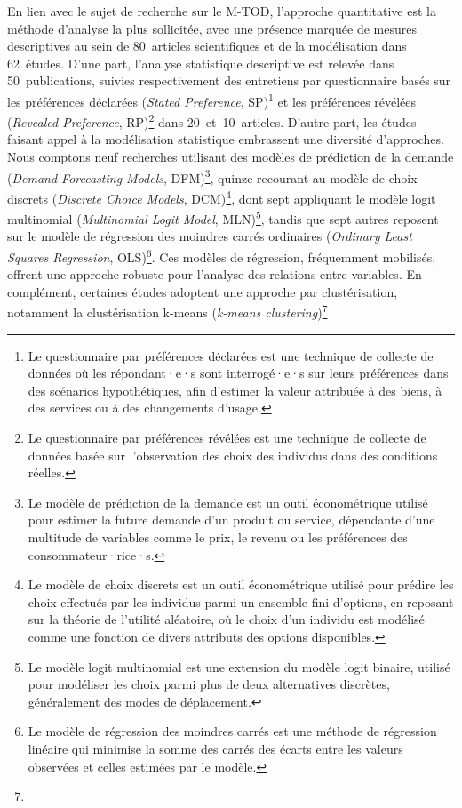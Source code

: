 \begin{refsegment}
En lien avec le sujet de recherche sur le \acrshort{M-TOD}, l'approche quantitative est la méthode d'analyse la plus sollicitée, avec une présence marquée de mesures descriptives au sein de 80~articles scientifiques et de la modélisation dans 62~études. D'une part, l'analyse statistique descriptive est relevée dans 50~publications, suivies respectivement des entretiens par questionnaire basés sur les préférences déclarées (\textsl{Stated Preference}, SP)\footnote{
    Le questionnaire par préférences déclarées est une technique de collecte de données où les répondant·e·s sont interrogé·e·s sur leurs préférences dans des scénarios hypothétiques, afin d'estimer la valeur attribuée à des biens, à des services ou à des changements d'usage.
} et les préférences révélées (\textsl{Revealed Preference}, RP)\footnote{
    Le questionnaire par préférences révélées est une technique de collecte de données basée sur l'observation des choix des individus dans des conditions réelles.
} dans 20~et~10~articles. D'autre part, les études faisant appel à la modélisation statistique embrassent une diversité d'approches. Nous comptons neuf recherches utilisant des modèles de prédiction de la demande (\textsl{Demand Forecasting Models}, DFM)\footnote{
    Le modèle de prédiction de la demande est un outil économétrique utilisé pour estimer la future demande d'un produit ou service, dépendante d'une multitude de variables comme le prix, le revenu ou les préférences des consommateur·rice·s.
}, quinze recourant au modèle de choix discrets (\textsl{Discrete Choice Models}, DCM)\footnote{
    Le modèle de choix discrets est un outil économétrique utilisé pour prédire les choix effectués par les individus parmi un ensemble fini d'options, en reposant sur la théorie de l'utilité aléatoire, où le choix d'un individu est modélisé comme une fonction de divers attributs des options disponibles.
}, dont sept appliquant le modèle logit multinomial (\textsl{Multinomial Logit Model}, MLN)\footnote{
    Le modèle logit multinomial est une extension du modèle logit binaire, utilisé pour modéliser les choix parmi plus de deux alternatives discrètes, généralement des modes de déplacement.
}, tandis que sept autres reposent sur le modèle de régression des moindres carrés ordinaires (\textsl{Ordinary Least Squares Regression}, OLS)\footnote{
    Le modèle de régression des moindres carrés est une méthode de régression linéaire qui minimise la somme des carrés des écarts entre les valeurs observées et celles estimées par le modèle.
}. Ces modèles de régression, fréquemment mobilisés, offrent une approche robuste pour l'analyse des relations entre variables. En complément, certaines études adoptent une approche par clustérisation, notamment la clustérisation k-means (\textsl{k-means clustering})\footnote{
}
\end{refsegment}
